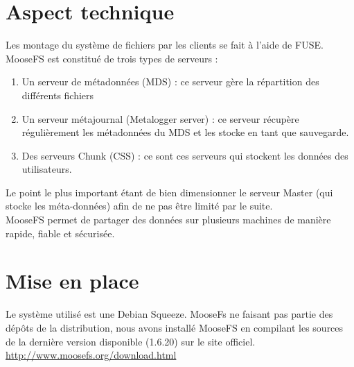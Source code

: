 \documentclass[12pt]{report}
\begin{document}
			\section{Aspect technique}
				
				Les montage du système de fichiers par les clients se fait à l'aide de FUSE.
				MooseFS est constitué de trois types de serveurs :

				\begin{enumerate}
					\item Un serveur de métadonnées (MDS) : ce serveur gère la répartition des différents fichiers
					\item Un serveur métajournal (Metalogger server) : ce serveur récupère régulièrement les métadonnées du MDS et les stocke en tant que sauvegarde.
					\item Des serveurs Chunk (CSS) : ce sont ces serveurs qui stockent les données des utilisateurs.
				\end{enumerate}
				
				Le point le plus important étant de bien dimensionner le serveur Master (qui stocke les méta-données)
				afin de ne pas être limité par le suite.\\

				MooseFS permet de partager des données sur plusieurs machines de manière rapide, fiable et sécurisée.

		\section{Mise en place}

Le système utilisé est une Debian Squeeze. MooseFs ne faisant pas partie des dépôts de la distribution, nous avons installé MooseFS en compilant les sources de la dernière version disponible (1.6.20) sur le site officiel.\\
\href{http://pro.hit.gemius.pl/hitredir/id=0sWa0S8ft4sTAHF1bGAAEZPcP3ziyq7f9SdhoQf7oeT.c7/url=moosefs.org/tl\_files/mfscode/mfs-1.6.20-2.tar.gz}{http://www.moosefs.org/download.html} \\\\
\end{document}
